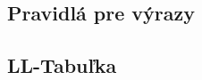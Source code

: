 \documentclass[a4paper, 12pt]{article}[25.11.2020]
\begin{document}
    \begin{center}
        \section{Pravidlá pre výrazy}
            \begin{figure}[h]
                \centering
            \end{figure}
    \end{center}
\newpage
    \begin{landscape}
        \begin{center}
            \section{LL-Tabuľka}
                \begin{figure}[h]
                \end{figure}
        \end{center}
    \end{landscape}
\end{document}
